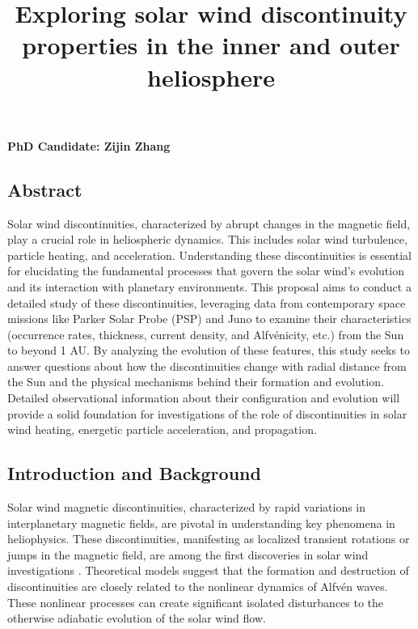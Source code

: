 \documentclass[
  letterpaper,
  DIV=11,
  numbers=noendperiod]{scrartcl}
\title{Exploring solar wind discontinuity properties in the inner and outer heliosphere}
\author{}
\date{}
\begin{document}
\maketitle

\vspace{-20truemm}


\textbf{PhD Candidate: Zijin Zhang}

\subsection{Abstract}\label{abstract}

Solar wind discontinuities, characterized by abrupt changes in the magnetic field, play a crucial role in heliospheric dynamics. This includes solar wind turbulence, particle heating, and acceleration. Understanding these discontinuities is essential for elucidating the fundamental processes that govern the solar wind's evolution and its interaction with planetary environments. This proposal aims to conduct a detailed study of these discontinuities, leveraging data from contemporary space missions like Parker Solar Probe (PSP) and Juno to examine their characteristics (occurrence rates, thickness, current density, and Alfvénicity, etc.) from the Sun to beyond 1 AU. By analyzing the evolution of these features, this study seeks to answer questions about how the discontinuities change with radial distance from the Sun and the physical mechanisms behind their formation and evolution. Detailed observational information about their configuration and evolution will provide a solid foundation for investigations of the role of discontinuities in solar wind heating, energetic particle acceleration, and propagation.

\subsection{Introduction and Background}\label{introduction-and-background}

Solar wind magnetic discontinuities, characterized by rapid variations in interplanetary magnetic fields, are pivotal in understanding key phenomena in heliophysics. These discontinuities, manifesting as localized transient rotations or jumps in the magnetic field, are among the first discoveries in solar wind investigations \citep{colburnDiscontinuitiesSolarWind1966}. Theoretical models suggest that the formation and destruction of discontinuities are closely related to the nonlinear dynamics of Alfvén waves. These nonlinear processes can create significant isolated disturbances to the otherwise adiabatic evolution of the solar wind flow.
\end{document}
